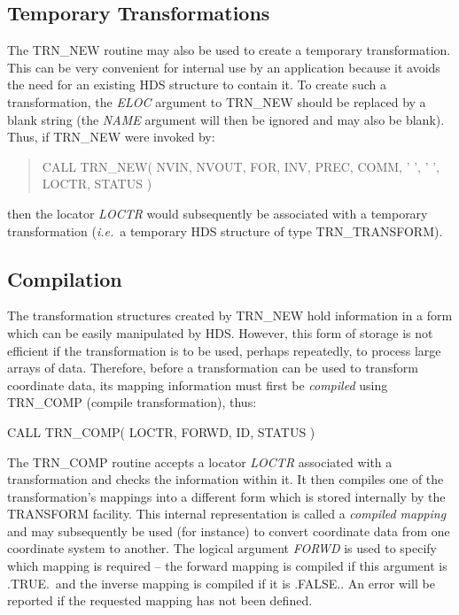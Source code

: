\documentclass[twoside,nolof,11pt]{starlink}
\providecommand{\name}[1]{\small{#1}}
\providecommand{\fortvar}[1]{\emph{#1}}
\begin{document}
\subsection{Temporary Transformations}

\label{section:simple:temporary}

The \name{TRN\_NEW} routine may also be used to create a temporary
transformation.
This can be very convenient for internal use by an application because it
avoids the need for an existing \name{HDS} structure to contain it.
To create such a transformation, the \fortvar{ELOC} argument to
\name{TRN\_NEW} should be replaced by a blank string (the \fortvar{NAME}
argument will then be ignored and may also be blank).
Thus, if \name{TRN\_NEW} were invoked by:

\begin{quote}\small
\begin{terminalv}
CALL TRN_NEW( NVIN, NVOUT, FOR, INV, PREC, COMM, ' ', ' ', LOCTR, STATUS )
\end{terminalv}
\end{quote}

then the locator \fortvar{LOCTR} would subsequently be associated with a
temporary transformation (\emph{i.e.}\ a temporary \name{HDS} structure of
type \name{TRN\_TRANSFORM}).


\subsection{Compilation}

The transformation structures created by \name{TRN\_NEW} hold information in
a form which can be easily manipulated by \name{HDS}.
However, this form of storage is not efficient if the transformation is to
be used, perhaps repeatedly, to process large arrays of data.
Therefore, before a transformation can be used to transform coordinate data,
its mapping information must first be \emph{compiled} using \name{TRN\_COMP}
(compile transformation), thus:

\begin{terminalv}
      CALL TRN_COMP( LOCTR, FORWD, ID, STATUS )
\end{terminalv}

The \name{TRN\_COMP} routine accepts a locator \fortvar{LOCTR} associated
with a transformation and checks the information within it.
It then compiles one of the transformation's mappings into a different form
which is stored internally by the \name{TRANSFORM} facility.
This internal representation is called a \emph{compiled mapping} and may
subsequently be used (for instance) to convert coordinate data from one
coordinate system to another.
The logical argument \fortvar{FORWD} is used to specify which mapping is
required -- the forward mapping is compiled if this argument is
\name{.TRUE.}\ and the inverse mapping is compiled if it is \name{.FALSE.}.
An error will be reported if the requested mapping has not been defined.
\end{document}
